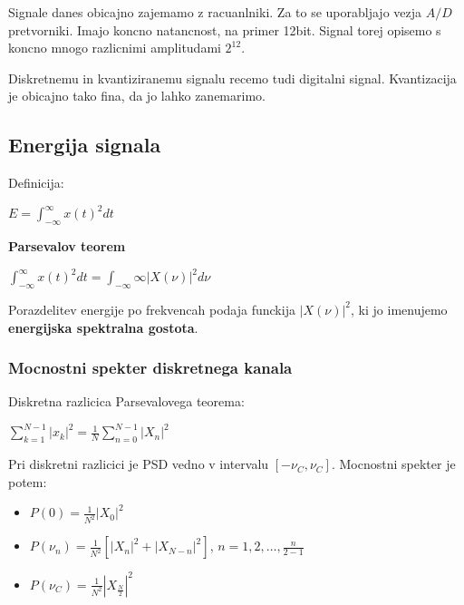 \documentclass{article}
\begin{document}
\begin{multicols}{4}
Signale danes obicajno zajemamo z racuanlniki. Za to se uporabljajo vezja $A/D$ pretvorniki. Imajo koncno natancnost,
na primer 12bit. Signal torej opisemo s koncno mnogo razlicnimi amplitudami $2^{12}$.

Diskretnemu in kvantiziranemu signalu recemo tudi digitalni signal. Kvantizacija je obicajno tako fina, da jo lahko zanemarimo.

\subsection{Energija signala}
Definicija:
\begin{center}
    \begin{math}
        E = \int_{-\infty}^{\infty} x(t)^2 dt
    \end{math}
\end{center}

\textbf{Parsevalov teorem}
\begin{center}
    \begin{math}
        \int_{-\infty}^{\infty} x(t)^2 dt = \int_{-\infty}{\infty} |X(\nu)|^2 d\nu
    \end{math}
\end{center}

Porazdelitev energije po frekvencah podaja funckija $|X(\nu)|^2$, ki jo imenujemo \textbf{energijska spektralna gostota}.

\subsubsection{Mocnostni spekter diskretnega kanala}
Diskretna razlicica Parsevalovega teorema:
\begin{center}
    \begin{math}
        \sum_{k=1}^{N-1} |x_k|^2 = \frac{1}{N} \sum_{n=0}^{N-1} |X_n|^2
    \end{math}
\end{center}
Pri diskretni razlicici je PSD vedno v intervalu $[- \nu_C, \nu_C]$.
Mocnostni spekter je potem:
\begin{itemize}
    \item $P(0) = \frac{1}{N^2} |X_0|^2$
    \item $P(\nu_n) = \frac{1}{N^2} [|X_n|^2 + |X_{N-n}|^2]$, $n = 1, 2, \dots, \frac{n}{2-1}$
    \item $P(\nu_C) = \frac{1}{N^2}|X_{\frac{N}{2}}|^2$
\end{itemize}

\end{multicols}
\end{document}
